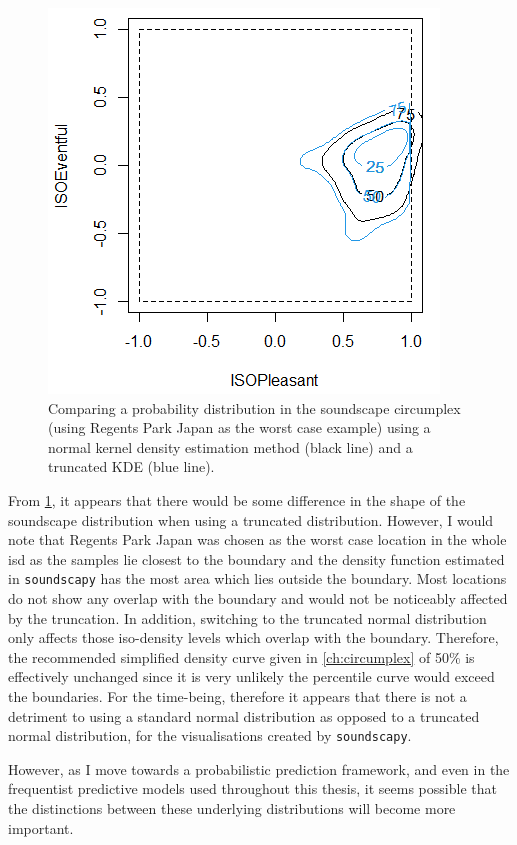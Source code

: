 \begin{figure}
  \centering
  \includegraphics{Figures/Trunc-Normal-demo.png}
  \caption{Comparing a probability distribution in the soundscape circumplex (using Regents Park Japan as the worst case example) using a normal kernel density estimation method (black line) and a truncated KDE (blue line). \label{fig:truncatekde}}
\end{figure}

From \cref{fig:truncatekde}, it appears that there would be some difference in the shape of the soundscape distribution when using a truncated distribution. However, I would note that Regents Park Japan was chosen as the worst case location in the whole \gls{isd} as the samples lie closest to the boundary and the density function estimated in \texttt{soundscapy} has the most area which lies outside the boundary. Most locations do not show any overlap with the boundary and would not be noticeably affected by the truncation. In addition, switching to the truncated normal distribution only affects those iso-density levels which overlap with the boundary. Therefore, the recommended simplified density curve given in \cref{ch:circumplex} of 50\% is effectively unchanged since it is very unlikely the  percentile curve would exceed the boundaries. For the time-being, therefore it appears that there is not a detriment to using a standard normal distribution as opposed to a truncated normal distribution, for the visualisations created by \texttt{soundscapy}.

However, as I move towards a probabilistic prediction framework, and even in the frequentist predictive models used throughout this thesis, it seems possible that the distinctions between these underlying distributions will become more important.

